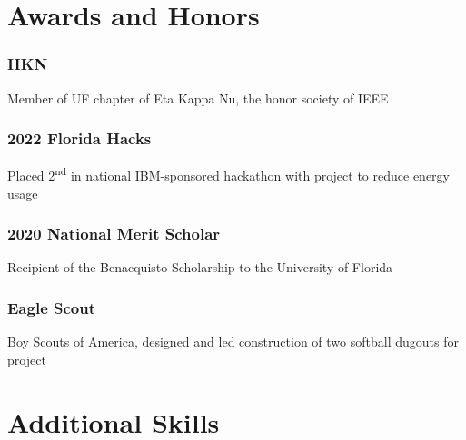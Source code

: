 \documentclass{article}
\newcommand{\sectionspacing}{\vspace{-.4em}} %
\begin{document}

\sectionspacing{}
\section{Awards and Honors}

\subsubsection{HKN}
Member of UF chapter of Eta Kappa Nu, the honor society of IEEE

\subsubsection{2022 Florida Hacks}
Placed 2\textsuperscript{nd} in national IBM-sponsored hackathon with project to reduce energy usage


\subsubsection{2020 National Merit Scholar}
Recipient of the Benacquisto Scholarship to the University of Florida

\subsubsection{Eagle Scout}
Boy Scouts of America,
designed and led construction of two softball dugouts for project

\sectionspacing{}
\section{Additional Skills}
\end{document}
